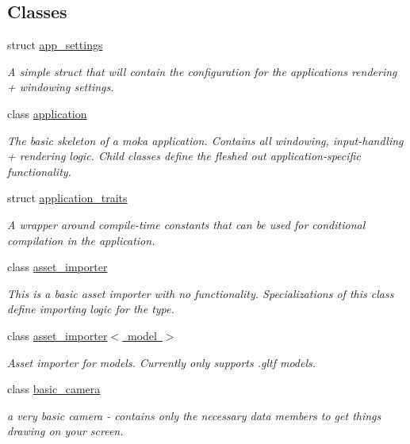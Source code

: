 \subsection*{Classes}
\begin{DoxyCompactItemize}
\item 
struct \mbox{\hyperlink{structmoka_1_1app__settings}{app\+\_\+settings}}
\begin{DoxyCompactList}\small\item\em A simple struct that will contain the configuration for the application\textquotesingle{}s rendering + windowing settings. \end{DoxyCompactList}\item 
class \mbox{\hyperlink{classmoka_1_1application}{application}}
\begin{DoxyCompactList}\small\item\em The basic skeleton of a moka application. Contains all windowing, input-\/handling + rendering logic. Child classes define the fleshed out application-\/specific functionality. \end{DoxyCompactList}\item 
struct \mbox{\hyperlink{structmoka_1_1application__traits}{application\+\_\+traits}}
\begin{DoxyCompactList}\small\item\em A wrapper around compile-\/time constants that can be used for conditional compilation in the application. \end{DoxyCompactList}\item 
class \mbox{\hyperlink{classmoka_1_1asset__importer}{asset\+\_\+importer}}
\begin{DoxyCompactList}\small\item\em This is a basic asset importer with no functionality. Specializations of this class define importing logic for the type. \end{DoxyCompactList}\item 
class \mbox{\hyperlink{classmoka_1_1asset__importer_3_01model_01_4}{asset\+\_\+importer$<$ model $>$}}
\begin{DoxyCompactList}\small\item\em Asset importer for models. Currently only supports .gltf models. \end{DoxyCompactList}\item 
class \mbox{\hyperlink{classmoka_1_1basic__camera}{basic\+\_\+camera}}
\begin{DoxyCompactList}\small\item\em a very basic camera -\/ contains only the necessary data members to get things drawing on your screen. \end{DoxyCompactList}\item 

\end{DoxyCompactItemize}
